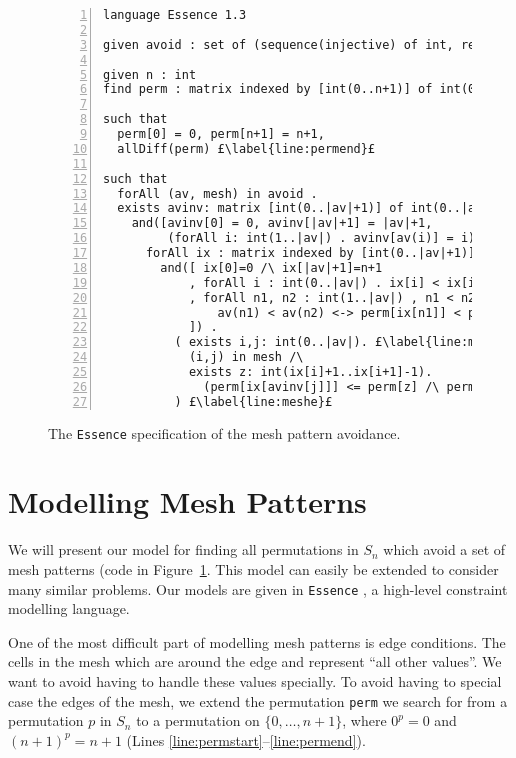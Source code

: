\documentclass[11pt]{article}
\theoremstyle{plain}
\theoremstyle{definition}
\theoremstyle{remark}
\newcommand{\essence}{\texttt{Essence} }
\begin{document}
\begin{figure}
\begin{lstlisting}[numbers=left,escapechar=£]
language Essence 1.3

given avoid : set of (sequence(injective) of int, relation of (int*int)) £\label{line:mesh}£

given n : int
find perm : matrix indexed by [int(0..n+1)] of int(0..n+1) £\label{line:permstart}£

such that
  perm[0] = 0, perm[n+1] = n+1,
  allDiff(perm) £\label{line:permend}£
    
such that
  forAll (av, mesh) in avoid .
  exists avinv: matrix [int(0..|av|+1)] of int(0..|av|+1),£\label{line:avinvs}£
    and([avinv[0] = 0, avinv[|av|+1] = |av|+1,
         (forAll i: int(1..|av|) . avinv[av(i)] = i)]. £\label{line:avinve}£
      forAll ix : matrix indexed by [int(0..|av|+1)] of int(0..n+1),£\label{line:ixs}£
        and([ ix[0]=0 /\ ix[|av|+1]=n+1
            , forAll i : int(0..|av|) . ix[i] < ix[i+1]
            , forAll n1, n2 : int(1..|av|) , n1 < n2 .
                av(n1) < av(n2) <-> perm[ix[n1]] < perm[ix[n2]]£\label{line:ixe}£
            ]) .
          ( exists i,j: int(0..|av|). £\label{line:meshs}£
            (i,j) in mesh /\
            exists z: int(ix[i]+1..ix[i+1]-1).
              (perm[ix[avinv[j]]] <= perm[z] /\ perm[z] <= perm[ix[avinv[j+1]]])
          ) £\label{line:meshe}£
\end{lstlisting}
\caption{The \essence specification of the mesh pattern avoidance. \label{fig:model}}
\end{figure}



\section{Modelling Mesh Patterns}

We will present our model for finding all permutations in $S_n$ which avoid a set of mesh patterns (code in Figure~\ref{fig:model}. 
This model can easily be extended to consider many similar problems. 
Our models are given in \essence, a high-level constraint modelling language. 

\newpage

One of the most difficult part of modelling mesh patterns is edge conditions. 
The cells in the mesh which are around the edge and represent ``all other values''. 
We want to avoid having to handle these values specially. 
To avoid having to special case the edges of the mesh, we extend the permutation \texttt{perm} we search for from a permutation \(p\) in $S_n$ to a permutation on \(\{0,\dots,n+1\}\), where \(0^p=0\) and \((n+1)^p=n+1\) (Lines \ref{line:permstart}--\ref{line:permend}).
\end{document}
